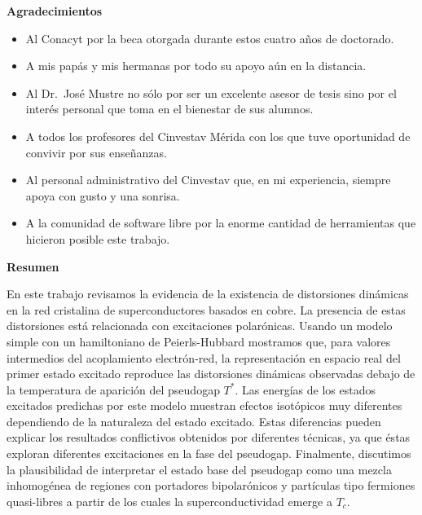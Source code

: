 
\cleardoublepage
{}
{}

\begin{center}
\textbf{\large Agradecimientos}
\end{center}
\vspace{3cm}

\begin{itemize}
    \item Al Conacyt por la beca otorgada durante estos cuatro años de doctorado.
    \item A mis pap\'{a}s y mis hermanas por todo su apoyo a\'{u}n en la distancia.
    \item Al Dr.\ Jos\'{e} Mustre no s\'{o}lo por ser un excelente asesor de tesis sino por el inter\'{e}s personal que toma en el bienestar de sus alumnos.
    \item A todos los profesores del Cinvestav M\'{e}rida con los que tuve oportunidad de convivir por sus enseñanzas.
    \item Al personal administrativo del Cinvestav que, en mi experiencia, siempre apoya con gusto y una sonrisa.
    \item A la comunidad de software libre por la enorme cantidad de herramientas que hicieron posible este trabajo.
\end{itemize}


\cleardoublepage
{}
{}
\begin{center}
\textbf{\large Resumen}
\end{center}
En este trabajo revisamos la evidencia de la existencia de distorsiones din\'{a}micas en la red cristalina de superconductores basados en cobre. 
La presencia de estas distorsiones est\'{a} relacionada con excitaciones polar\'{o}nicas. 
Usando un modelo simple con un hamiltoniano de Peierls-Hubbard mostramos que, para valores intermedios del acoplamiento electr\'{o}n-red, la representaci\'{o}n en espacio real del primer estado excitado reproduce las distorsiones din\'{a}micas observadas debajo de la temperatura de aparici\'{o}n del pseudogap $T^*$. 
Las energ\'{i}as de los estados excitados predichas por este modelo muestran efectos isot\'{o}picos muy diferentes dependiendo de la naturaleza del estado excitado. 
Estas diferencias pueden explicar los resultados conflictivos obtenidos por diferentes t\'{e}cnicas, ya que \'{e}stas exploran diferentes excitaciones en la fase del pseudogap. 
Finalmente, discutimos la plausibilidad de interpretar el estado base del pseudogap como una mezcla inhomog\'{e}nea de regiones con portadores bipolar\'{o}nicos y part\'{i}culas tipo fermiones quasi-libres a partir de los cuales la superconductividad emerge a $T_c$.

